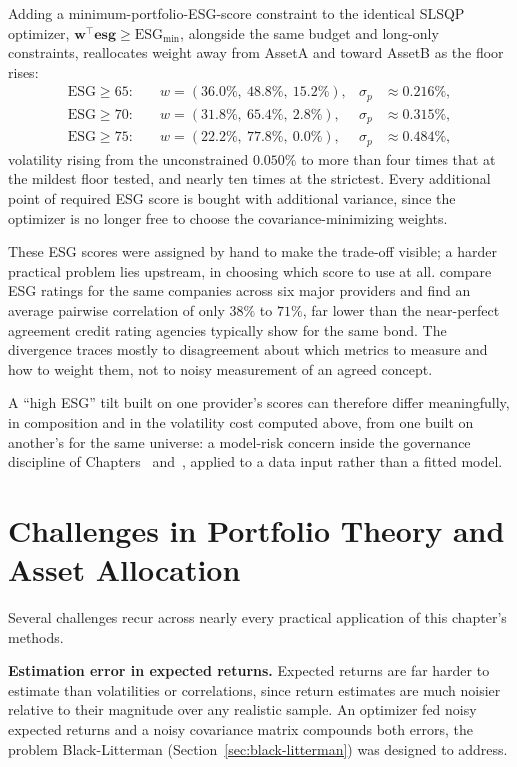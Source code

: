 \documentclass[../ai_in_finance]{subfiles}
\begin{document}
Adding a minimum-portfolio-ESG-score constraint to the identical SLSQP optimizer, $\mathbf{w}^\top \mathbf{esg} \ge \text{ESG}_{\min}$, alongside the same budget and long-only constraints, reallocates weight away from AssetA and toward AssetB as the floor rises:
\begin{align*}
\text{ESG} \ge 65: &\quad w = (36.0\%,\ 48.8\%,\ 15.2\%), & \sigma_p &\approx 0.216\%, \\
\text{ESG} \ge 70: &\quad w = (31.8\%,\ 65.4\%,\ 2.8\%), & \sigma_p &\approx 0.315\%, \\
\text{ESG} \ge 75: &\quad w = (22.2\%,\ 77.8\%,\ 0.0\%), & \sigma_p &\approx 0.484\%,
\end{align*}
volatility rising from the unconstrained $0.050\%$ to more than four times that at the mildest floor tested, and nearly ten times at the strictest. Every additional point of required ESG score is bought with additional variance, since the optimizer is no longer free to choose the covariance-minimizing weights.

These ESG scores were assigned by hand to make the trade-off visible; a harder practical problem lies upstream, in choosing which score to use at all. \textcite{berg2022aggregate} compare ESG ratings for the same companies across six major providers and find an average pairwise correlation of only $38\%$ to $71\%$, far lower than the near-perfect agreement credit rating agencies typically show for the same bond. The divergence traces mostly to disagreement about which metrics to measure and how to weight them, not to noisy measurement of an agreed concept.

A ``high ESG'' tilt built on one provider's scores can therefore differ meaningfully, in composition and in the volatility cost computed above, from one built on another's for the same universe: a model-risk concern inside the governance discipline of Chapters~ and~, applied to a data input rather than a fitted model.

\section{Challenges in Portfolio Theory and Asset Allocation}

Several challenges recur across nearly every practical application of this chapter's methods.

\textbf{Estimation error in expected returns.} Expected returns are far harder to estimate than volatilities or correlations, since return estimates are much noisier relative to their magnitude over any realistic sample. An optimizer fed noisy expected returns and a noisy covariance matrix compounds both errors, the problem Black-Litterman (Section~\ref{sec:black-litterman}) was designed to address.
\end{document}
